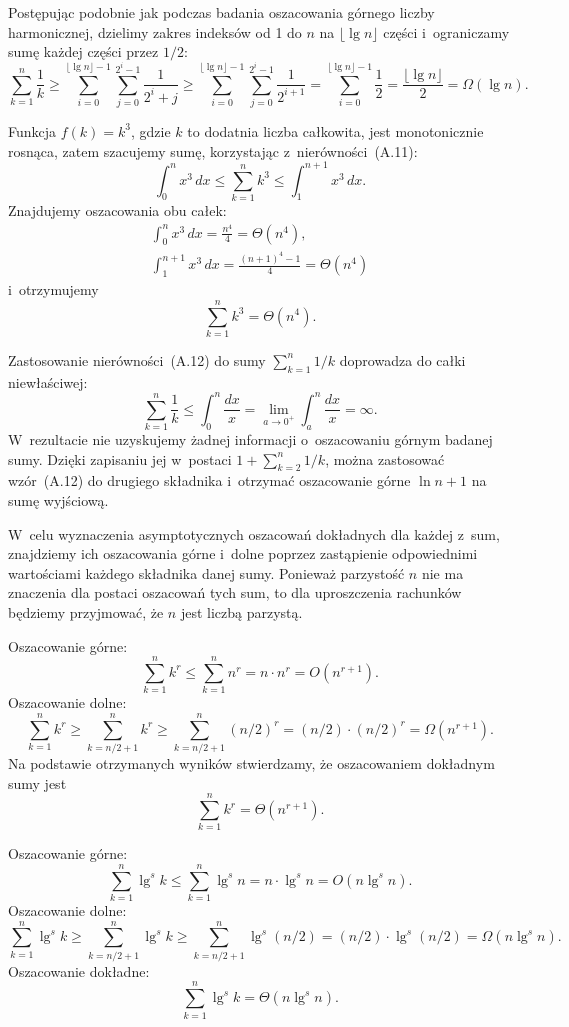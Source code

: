 \exercise %
Postępując podobnie jak podczas badania oszacowania górnego  liczby harmonicznej, dzielimy zakres indeksów od 1 do $n$ na $\lfloor\lg n\rfloor$ części i~ograniczamy sumę każdej części przez $1/2$:
\[
    \sum_{k=1}^n\frac{1}{k} \ge \sum_{i=0}^{\lfloor\lg n\rfloor-1}\sum_{j=0}^{2^i-1}\frac{1}{2^i+j} \ge \sum_{i=0}^{\lfloor\lg n\rfloor-1}\sum_{j=0}^{2^i-1}\frac{1}{2^{i+1}} = \sum_{i=0}^{\lfloor\lg n\rfloor-1}\frac{1}{2} = \frac{\lfloor\lg n\rfloor}{2} = \Omega(\lg n).
\]

\exercise %
Funkcja $f(k)=k^3$, gdzie $k$ to dodatnia liczba całkowita, jest monotonicznie rosnąca, zatem szacujemy sumę, korzystając z~nierówności~(A.11):
\[
	\int_0^nx^3\,dx \le \sum_{k=1}^nk^3 \le \int_1^{n+1}x^3\,dx.
\]
Znajdujemy oszacowania obu całek:
\begin{gather*}
	\int_0^nx^3\,dx = \frac{n^4}{4} = \Theta(n^4), \\[2mm]
	\int_1^{n+1}x^3\,dx = \frac{(n+1)^4-1}{4} = \Theta(n^4)
\end{gather*}
i~otrzymujemy
\[
	\sum_{k=1}^nk^3 = \Theta(n^4).
\]

\exercise %
Zastosowanie nierówności~(A.12) do sumy $\sum_{k=1}^n1/k$ doprowadza do całki niewłaściwej:
\[
	\sum_{k=1}^n\frac{1}{k} \le \int_0^n\frac{dx}{x} = \lim_{a\to0^+}\int_a^n\frac{dx}{x} = \infty.
\]
W~rezultacie nie uzyskujemy żadnej informacji o~oszacowaniu górnym badanej sumy.
Dzięki zapisaniu jej w~postaci $1+\sum_{k=2}^n1/k$, można zastosować wzór~(A.12) do drugiego składnika i~otrzymać oszacowanie górne $\ln n+1$ na sumę wyjściową.

\problems

W~celu wyznaczenia asymptotycznych oszacowań dokładnych dla każdej z~sum, znajdziemy ich oszacowania górne i~dolne poprzez zastąpienie odpowiednimi wartościami każdego składnika danej sumy.
Ponieważ parzystość $n$ nie ma znaczenia dla postaci oszacowań tych sum, to dla uproszczenia rachunków będziemy przyjmować, że $n$ jest liczbą parzystą.

\subproblem %
Oszacowanie górne:
\[
    \sum_{k=1}^nk^r \le \sum_{k=1}^nn^r = n\cdot n^r = O(n^{r+1}).
\]
Oszacowanie dolne:
\[
    \sum_{k=1}^nk^r \ge \sum_{k=n/2+1}^nk^r \ge \sum_{k=n/2+1}^n(n/2)^r = (n/2)\cdot(n/2)^r = \Omega(n^{r+1}).
\]
Na podstawie otrzymanych wyników stwierdzamy, że oszacowaniem dokładnym sumy jest
\[
    \sum_{k=1}^nk^r = \Theta(n^{r+1}).
\]

\subproblem %
Oszacowanie górne:
\[
    \sum_{k=1}^n\lg^sk \le \sum_{k=1}^n\lg^sn = n\cdot\lg^sn = O(n\lg^sn).
\]
Oszacowanie dolne:
\[
    \sum_{k=1}^n\lg^sk \ge \sum_{k=n/2+1}^n\lg^sk \ge \sum_{k=n/2+1}^n\lg^s(n/2) = (n/2)\cdot\lg^s(n/2) = \Omega(n\lg^sn).
\]
Oszacowanie dokładne:
\[
    \sum_{k=1}^n\lg^sk = \Theta(n\lg^sn).
\]

